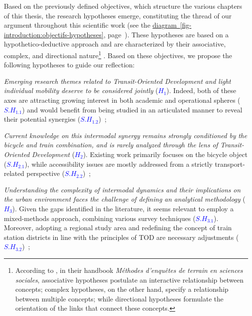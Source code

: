 \begin{refsegment}
Based on the previously defined objectives, which structure the various chapters of this thesis, the research hypotheses emerge, constituting the thread of our argument throughout this scientific work (see the \hyperref[fig-introduction:objectifs-hypotheses]{diagram~\ref{fig-introduction:objectifs-hypotheses}}, page~\pageref{fig-introduction:objectifs-hypotheses}). These hypotheses are based on a hypothetico-deductive approach and are characterized by their associative, complex, and directional nature\footnote{
    According to \textcolor{blue}{\textcite[41-43]{tomini_methodes_2020}}, in their handbook \textsl{Méthodes d'enquêtes de terrain en sciences sociales}, associative hypotheses postulate an interactive relationship between concepts; complex hypotheses, on the other hand, specify a relationship between multiple concepts; while directional hypotheses formulate the orientation of the links that connect these concepts.
} \textcolor{blue}{\autocite[43]{tomini_methodes_2020}}. Based on these objectives, we propose the following hypotheses to guide our reflection:
        \begin{customitemize}
    \item \textsl{Emerging research themes related to \textsl{Transit-Oriented Development} and light individual mobility deserve to be considered jointly} ({\textcolor{blue}{\(H_1\)}\label{hypothese-1}}). Indeed, both of these axes are attracting growing interest in both academic and operational spheres ({\textcolor{blue}{\(S.H_{1.1}\)}\label{sous-hypothese-1.1}}) and would benefit from being studied in an articulated manner to reveal their potential synergies ({\textcolor{blue}{\(S.H_{1.2}\)}\label{sous-hypothese-1.2}})~;
    \item \textsl{Current knowledge on this intermodal synergy remains strongly conditioned by the bicycle and train combination, and is rarely analyzed through the lens of \textsl{Transit-Oriented Development}} ({\textcolor{blue}{\(H_2\)}\label{hypothese-2}}). Existing work primarily focuses on the bicycle object ({\textcolor{blue}{\(S.H_{2.1}\)}\label{sous-hypothese-2.1}}), while accessibility issues are mostly addressed from a strictly transport-related perspective ({\textcolor{blue}{\(S.H_{2.2}\)}\label{sous-hypothese-2.2}})~;
    \item \textsl{Understanding the complexity of intermodal dynamics and their implications on the urban environment faces the challenge of defining an analytical methodology} ({\textcolor{blue}{\(H_3\)}\label{hypothese-3}}). Given the gaps identified in the literature, it seems relevant to employ a mixed-methods approach, combining various survey techniques ({\textcolor{blue}{\(S.H_{3.1}\)}\label{sous-hypothese-3.1}}). Moreover, adopting a regional study area and redefining the concept of train station districts in line with the principles of \acrshort{TOD} are necessary adjustments ({\textcolor{blue}{\(S.H_{3.2}\)}\label{sous-hypothese-3.2}})~;

\end{customitemize}
\end{refsegment}
